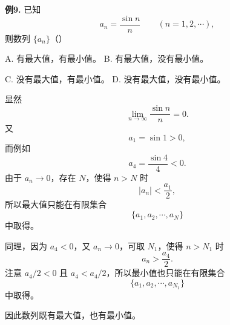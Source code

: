 \begin{problemblock}
\textbf{例9.} 已知
\[
a_n=\frac{\sin n}{n}\qquad (n=1,2,\cdots),
\]
则数列 \(\{a_n\}\)（\quad）

A. 有最大值，有最小值。
\quad B. 有最大值，没有最小值。

C. 没有最大值，有最小值。
\quad D. 没有最大值，没有最小值。
\end{problemblock}
\begin{solutionblock}
显然
\[
\lim_{n\to\infty}\frac{\sin n}{n}=0.
\]
又
\[
a_1=\sin1>0,
\]
而例如
\[
a_4=\frac{\sin4}{4}<0.
\]
由于 \(a_n\to0\)，存在 \(N\)，使得 \(n>N\) 时
\[
|a_n|<\frac{a_1}{2},
\]
所以最大值只能在有限集合
\[
\{a_1,a_2,\cdots,a_N\}
\]
中取得。

同理，因为 \(a_4<0\)，又 \(a_n\to0\)，可取 \(N_1\)，使得 \(n>N_1\) 时
\[
a_n>\frac{a_4}{2}.
\]
注意 \(a_4/2<0\) 且 \(a_4<a_4/2\)，所以最小值也只能在有限集合
\[
\{a_1,a_2,\cdots,a_{N_1}\}
\]
中取得。

因此数列既有最大值，也有最小值。
\end{solutionblock}

